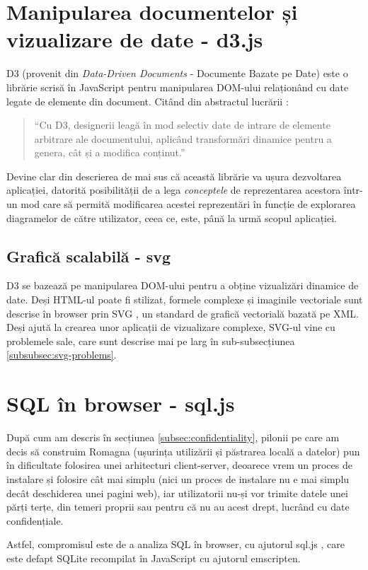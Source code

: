 \documentclass[12pt, a4paper, twoside, romanian]{teza-upb}
\begin{document}
  \section{Manipularea documentelor și vizualizare de date - d3.js}
    D3 (provenit din \textit{Data-Driven Documents} - Documente Bazate pe Date) este o librărie scrisă în JavaScript pentru manipularea DOM-ului relaționând cu date legate de elemente din document. Citând din abstractul lucrării \cite{bostock:2011:d3}:
    \begin{quote}
      ``Cu D3, designerii leagă în mod selectiv date de intrare de elemente arbitrare ale documentului, aplicând transformări dinamice pentru a genera, cât și a modifica conținut.''
    \end{quote}
    Devine clar din descrierea de mai sus că această librărie va ușura dezvoltarea aplicației, datorită posibilității de a lega \textit{conceptele} de reprezentarea acestora într-un mod care să permită modificarea acestei reprezentări în funcție de explorarea diagramelor de către utilizator, ceea ce, este, până la urmă scopul aplicației.
    \subsection{Grafică scalabilă - svg}

      D3 se bazează pe manipularea DOM-ului pentru a obține vizualizări dinamice de date. Deși HTML-ul poate fi stilizat, formele complexe și imaginile vectoriale sunt descrise în browser prin SVG \cite{Ferraiolo:01:SVG}, un standard de grafică vectorială bazată pe XML. Deși ajută la crearea unor aplicații de vizualizare complexe, SVG-ul vine cu problemele sale, care sunt descrise mai pe larg în sub-subsecțiunea \ref{subsubsec:svg-problems}.
  \section{SQL în browser - sql.js}
    După cum am descris în secțiunea \ref{subsec:confidentiality}, pilonii pe care am decis să construim Romagna (ușurința utilizării și păstrarea locală a datelor) pun în dificultate folosirea unei arhitecturi client-server, deoarece vrem un proces de instalare și folosire cât mai simplu (nici un proces de instalare nu e mai simplu decât deschiderea unei pagini web), iar utilizatorii nu-și vor trimite datele unei părți terțe, din temeri proprii sau pentru că nu au acest drept, lucrând cu date confidențiale.

    Astfel, compromisul este de a analiza SQL în browser, cu ajutorul sql.js \cite{sqljs:homepage}, care este defapt SQLite recompilat în JavaScript cu ajutorul emscripten.
\end{document}
